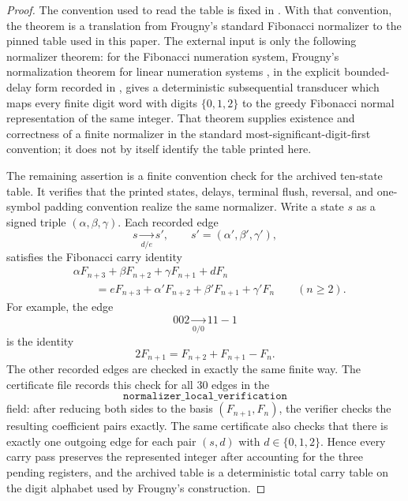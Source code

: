 \begin{proof}
The convention used to read the table is fixed in
.  With that convention, the theorem
is a translation from Frougny's standard Fibonacci normalizer to the pinned
table used in this paper.  The external input is only the following normalizer
theorem: for the Fibonacci numeration system, Frougny's normalization theorem
for linear numeration systems \cite{Frougny1992NumbersAutomata}, in the
explicit bounded-delay form recorded in
\cite[Corollary~4]{Frougny1999OnlineAddition}, gives a deterministic
subsequential transducer which maps every finite digit word with digits
\(\{0,1,2\}\) to the greedy Fibonacci normal representation of the same
integer.  That theorem supplies existence and correctness of a finite
normalizer in the standard most-significant-digit-first convention; it does not
by itself identify the table printed here.

The remaining assertion is a finite convention check for the archived ten-state
table.  It verifies that the printed states, delays, terminal flush, reversal,
and one-symbol padding convention realize the same normalizer.  Write a state
\(s\) as a signed triple \((\alpha,\beta,\gamma)\).  Each recorded edge
\[
  s\xrightarrow[d/e]{}s',
  \qquad
  s'=(\alpha',\beta',\gamma'),
\]
satisfies the Fibonacci carry identity
\[
  \begin{aligned}
  &\alpha F_{n+3}+\beta F_{n+2}+\gamma F_{n+1}+dF_n\\
  &\qquad =
  eF_{n+3}+\alpha'F_{n+2}+\beta'F_{n+1}+\gamma'F_n
  \qquad(n\ge2).
  \end{aligned}
\]
For example, the edge
\[
  002\xrightarrow[0/0]{}11{-}1
\]
is the identity
\[
  2F_{n+1}=F_{n+2}+F_{n+1}-F_n.
\]
The other recorded edges are checked in exactly the same finite way.  The
certificate file records this check for all \(30\) edges in the
\[
\texttt{normalizer\_local\_verification}
\]
field: after reducing both sides to the basis \((F_{n+1},F_n)\), the verifier
checks the resulting coefficient pairs exactly.  The same certificate also
checks that there is exactly one outgoing edge for each pair \((s,d)\) with
\(d\in\{0,1,2\}\).  Hence every carry pass preserves the represented integer
after accounting for the three pending registers, and the archived table is a
deterministic total carry table on the digit alphabet used by Frougny's
construction.


\end{proof}
